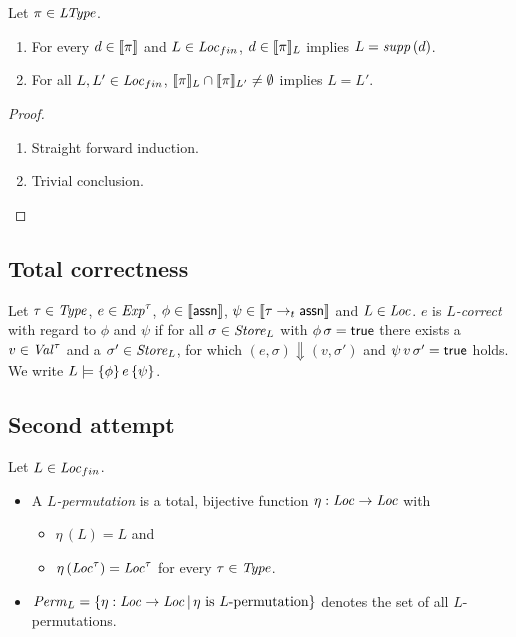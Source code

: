 \documentclass[12pt,a4paper]{report}
\begin{document}
\begin{lemma}
  Let $\pi\in\mathit{LType}$.
  \begin{enumerate}
    \item For every $d\in\llbracket\pi\rrbracket$ and $L\in\mathit{Loc}_{fin}$,
          $d\in\llbracket\pi\rrbracket_L$ implies $L = \mathit{supp}\,(d)$.
    \item For all $L,L'\in\mathit{Loc}_{fin}$, $\llbracket\pi\rrbracket_L \cap \llbracket\pi\rrbracket_{L'} \ne \emptyset$
          implies $L = L'$.
  \end{enumerate}
\end{lemma}

\begin{proof} \
  \begin{enumerate}
    \item Straight forward induction.
    \item Trivial conclusion.
  \end{enumerate}
\end{proof}



\subsection{Total correctness}

\begin{definition}
  Let $\tau\in\mathit{Type}$, $e\in\mathit{Exp}^\tau$, $\phi\in\llbracket\mathsf{assn}\rrbracket$, $\psi\in\llbracket\tau\rightarrow_t\mathsf{assn}\rrbracket$
  and $L\in\mathit{Loc}$. $e$ is {\em $L$-correct} with regard to $\phi$ and $\psi$ if for all
  $\sigma\in\mathit{Store}_L$ with $\phi\,\sigma=\mathsf{true}$ there exists a $v\in\mathit{Val}^\tau$ and a $\sigma'\in\mathit{Store}_L$,
  for which $(e,\sigma) \Downarrow (v,\sigma')$ and $\psi\,v\,\sigma' = \mathsf{true}$ holds. We write
  $L \models \{\phi\}\,e\,\{\psi\}$.
\end{definition}




\pagebreak
\subsection{Second attempt}

\begin{definition}
  Let $L\in\mathit{Loc}_{fin}$.
  \begin{itemize}
    \item A {\em $L$-permutation} is a total, bijective function $\eta:\mathit{Loc} \to \mathit{Loc}$ with
          \begin{itemize}
            \item $\eta\,(L) = L$ and
            \item $\eta\,(\mathit{Loc}^\tau) = \mathit{Loc}^\tau$ for every $\tau\in\mathit{Type}$.
          \end{itemize}
    \item $\mathit{Perm}_L = \{\eta:\mathit{Loc} \to \mathit{Loc}\,|\,\text{$\eta$ is $L$-permutation}\}$ denotes the
          set of all $L$-permutations.
  \end{itemize}
\end{definition}
\end{document}
